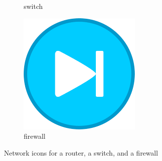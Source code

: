 {\begin{figure}
\begin{subfigure}[b]{18mm}
   \caption{switch}
   \label{fig:icon-switch}
   \end{subfigure}
   \qquad
   \begin{subfigure}[b]{18mm}
   \includegraphics[width=\textwidth]{images/firewall.png}
   \caption{firewall}
   \label{fig:icon-firewall}
   \end{subfigure}
   \caption{Network icons for a router, a switch, and a firewall}
   \label{fig:icons}
\end{figure}
}
